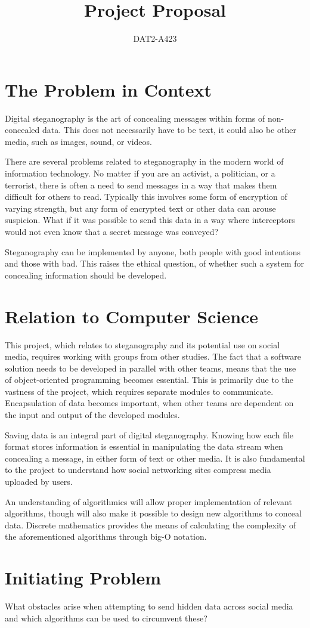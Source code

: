 \documentclass[a4paper,12pt,hidelinks]{article}
\newcommand{\group}{DAT2-A423}
\begin{document}
	\title{Project Proposal}
	\author{\group}
	\maketitle	
	\section*{The Problem in Context}
Digital steganography is the art of concealing messages within forms of non-concealed data. This does not necessarily have to be text, it could also be other media, such as images, sound, or videos.

There are several problems related to steganography in the modern world of information technology. No matter if you are an activist, a politician, or a terrorist, there is often a need to send messages in a way that makes them difficult for others to read. Typically this involves some form of encryption of varying strength, but any form of encrypted text or other data can arouse suspicion. What if it was possible to send this data in a way where interceptors would not even know that a secret message was conveyed? 

Steganography can be implemented by anyone, both people with good intentions and those with bad. This raises the ethical question, of whether such a system for concealing information should be developed.

	\section*{Relation to Computer Science}
This project, which relates to steganography and its potential use on social media, requires working with groups from other studies. The fact that a software solution needs to be developed in parallel with other teams, means that the use of object-oriented programming becomes essential. This is primarily due to the vastness of the project, which requires separate modules to communicate. Encapsulation of data becomes important, when other teams are dependent on the input and output of the developed modules.
	
Saving data is an integral part of digital steganography. Knowing how each file format stores information is essential in manipulating the data stream when concealing a message, in either form of text or other media. It is also fundamental to the project to understand how social networking sites compress media uploaded by users.

An understanding of algorithmics will allow proper implementation of relevant algorithms, though will also make it possible to design new algorithms to conceal data. Discrete mathematics provides the means of calculating the complexity of the aforementioned algorithms through big-O notation.

	\section*{Initiating Problem}
What obstacles arise when attempting to send hidden data across social media and which algorithms can be used to circumvent these?
\end{document}
